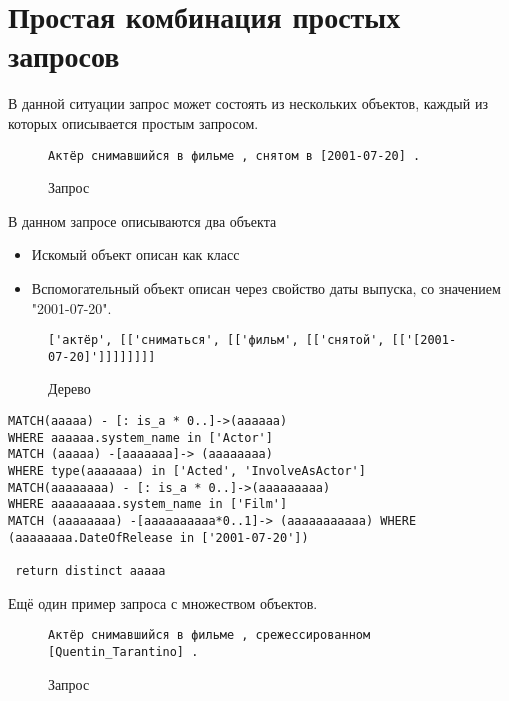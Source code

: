 \section{Простая комбинация простых запросов}
В данной ситуации запрос может состоять из нескольких объектов, каждый из которых описывается простым запросом.\\
\begin{figure}[!h]
\begin{tcolorbox}[colback=white, sharpish corners]
\begin{verbatim}
Актёр снимавшийся в фильме , снятом в [2001-07-20] .
\end{verbatim}
\end{tcolorbox}
\caption{Запрос}
\end{figure}
В данном запросе описываются два объекта
\begin{itemize}
\item Искомый объект описан как класс
\item Вспомогательный объект описан через свойство даты выпуска, со значением "2001-07-20".
\end{itemize}
\begin{figure}[!h]
\begin{tcolorbox}[colback=white, sharpish corners]
\begin{verbatim}
['актёр', [['сниматься', [['фильм', [['снятой', [['[2001-07-20]']]]]]]]]
\end{verbatim}
\end{tcolorbox}
\caption{Дерево}
\end{figure}
\newpage
\begin{lstlisting}[caption={Результат}]
MATCH(aaaaa) - [: is_a * 0..]->(aaaaaa)
WHERE aaaaaa.system_name in ['Actor']
MATCH (aaaaa) -[aaaaaaa]-> (aaaaaaaa) 
WHERE type(aaaaaaa) in ['Acted', 'InvolveAsActor']
MATCH(aaaaaaaa) - [: is_a * 0..]->(aaaaaaaaa)
WHERE aaaaaaaaa.system_name in ['Film']
MATCH (aaaaaaaa) -[aaaaaaaaaa*0..1]-> (aaaaaaaaaaa) WHERE (aaaaaaaa.DateOfRelease in ['2001-07-20'])

 return distinct aaaaa
\end{lstlisting}
Ещё один пример запроса с множеством объектов.
\begin{figure}[!h]
\begin{tcolorbox}[colback=white, sharpish corners]
\begin{verbatim}
Актёр снимавшийся в фильме , срежессированном [Quentin_Tarantino] .
\end{verbatim}
\end{tcolorbox}
\caption{Запрос}
\end{figure}
